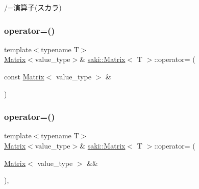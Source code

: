 /=演算子(スカラ) 

\mbox{\label{classsaki_1_1_matrix_a1bb0e9517045aafd626e5083b5ffd451}} 
\subsubsection{\texorpdfstring{operator=()}{operator=()}\hspace{0.1cm}{\footnotesize\ttfamily [1/2]}}
{\footnotesize\ttfamily template$<$typename T$>$ \\
\mbox{\hyperlink{classsaki_1_1_matrix}{Matrix}}$<$value\+\_\+type$>$\& \mbox{\hyperlink{classsaki_1_1_matrix}{saki\+::\+Matrix}}$<$ T $>$\+::operator= (\begin{DoxyParamCaption}\item[{const \mbox{\hyperlink{classsaki_1_1_matrix}{Matrix}}$<$ value\+\_\+type $>$ \&}]{ }\end{DoxyParamCaption})\hspace{0.3cm}{\ttfamily [default]}}

\mbox{\label{classsaki_1_1_matrix_a1eed1469e0680969c0a0c4aab1f198fe}} 
\subsubsection{\texorpdfstring{operator=()}{operator=()}\hspace{0.1cm}{\footnotesize\ttfamily [2/2]}}
{\footnotesize\ttfamily template$<$typename T$>$ \\
\mbox{\hyperlink{classsaki_1_1_matrix}{Matrix}}$<$value\+\_\+type$>$\& \mbox{\hyperlink{classsaki_1_1_matrix}{saki\+::\+Matrix}}$<$ T $>$\+::operator= (\begin{DoxyParamCaption}\item[{\mbox{\hyperlink{classsaki_1_1_matrix}{Matrix}}$<$ value\+\_\+type $>$ \&\&}]{ }\end{DoxyParamCaption})\hspace{0.3cm}{\ttfamily [default]}, {\ttfamily [noexcept]}}

\mbox{\label{classsaki_1_1_matrix_a90b46906226e931a7dadfcff12726dbb}} 
